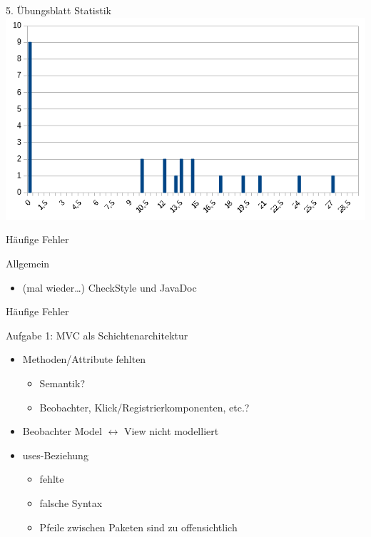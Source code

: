 \documentclass[18pt]{beamer}
\begin{document}
	\begin{frame}{5. Übungsblatt Statistik}
		\includegraphics[scale=0.7]{./pics/tut5/statistics-ub5.png}
	\end{frame}

	\begin{frame}{Häufige Fehler}
		\begin{block}{Allgemein}
			\begin{itemize}
				\item (mal wieder\dots) CheckStyle und JavaDoc
			\end{itemize}
		\end{block}
	\end{frame}

	\begin{frame}{Häufige Fehler}
		\begin{block}{Aufgabe 1: MVC als Schichtenarchitektur}
			\begin{itemize}
				\item Methoden/Attribute fehlten
				\begin{itemize}
					\item Semantik? 
					\item Beobachter, Klick/Registrierkomponenten, etc.?
				\end{itemize}
				\pause
				\item Beobachter Model $\leftrightarrow$ View nicht modelliert \pause
				\item uses-Beziehung 
				\begin{itemize}
					\item fehlte
					\item falsche Syntax
					\item Pfeile zwischen Paketen sind zu offensichtlich
				\end{itemize}
			\end{itemize}
		\end{block}
	\end{frame}
\end{document}
